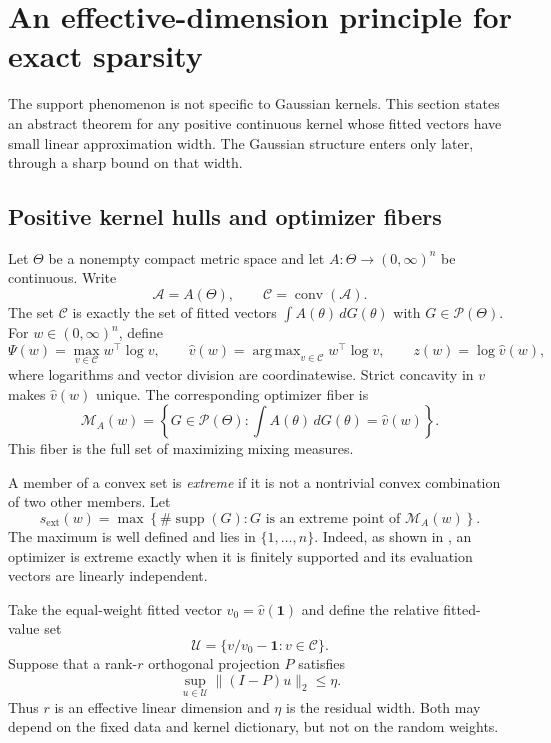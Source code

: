 \documentclass[11pt]{article}
\theoremstyle{definition}
\theoremstyle{remark}
\DeclareMathOperator*{\argmax}{arg\,max}
\DeclareMathOperator{\conv}{conv}
\DeclareMathOperator{\supp}{supp}
\newcommand{\Pcal}{\mathcal P}
\newcommand{\Mcal}{\mathcal M}
\newcommand{\Ccal}{\mathcal C}
\newcommand{\Acal}{\mathcal A}
\newcommand{\Ucal}{\mathcal U}
\newcommand{\one}{\bm 1}
\newcommand{\norm}[1]{\lVert #1\rVert}
\newcommand{\vhat}{\widehat v}
\begin{document}
\section{An effective-dimension principle for exact sparsity}
\label{sec:effective}

The support phenomenon is not specific to Gaussian kernels.  This section
states an abstract theorem for any positive continuous kernel whose fitted
vectors have small linear approximation width.  The Gaussian structure enters
only later, through a sharp bound on that width.

\subsection{Positive kernel hulls and optimizer fibers}

Let $\Theta$ be a nonempty compact metric space and let
$A:\Theta\to(0,\infty)^n$ be continuous.  Write
\[
 \Acal=A(\Theta),\qquad \Ccal=\conv(\Acal).
\]
The set $\Ccal$ is exactly the set of fitted vectors
$\int A(\theta)\,dG(\theta)$ with $G\in\Pcal(\Theta)$.  For
$w\in(0,\infty)^n$, define
\begin{equation}\label{eq:value}
 \Psi(w)=\max_{v\in\Ccal}w^\top\log v,
 \qquad
 \vhat(w)=\argmax_{v\in\Ccal}w^\top\log v,
 \qquad z(w)=\log\vhat(w),
\end{equation}
where logarithms and vector division are coordinatewise.  Strict concavity in
$v$ makes $\vhat(w)$ unique.  The corresponding optimizer fiber is
\begin{equation}\label{eq:fiber}
 \Mcal_A(w)=\left\{G\in\Pcal(\Theta):
       \int A(\theta)\,dG(\theta)=\vhat(w)\right\}.
\end{equation}
This fiber is the full set of maximizing mixing measures.

A member of a convex set is \emph{extreme} if it is not a nontrivial convex
combination of two other members.  Let
\begin{equation}\label{eq:sext}
 s_{\mathrm{ext}}(w)=
 \max\left\{\#\supp(G):G\text{ is an extreme point of }\Mcal_A(w)\right\}.
\end{equation}
The maximum is well defined and lies in $\{1,\ldots,n\}$.  Indeed, as shown in
, an optimizer is extreme exactly when it is finitely
supported and its evaluation vectors are linearly independent.

Take the equal-weight fitted vector $v_0=\vhat(\one)$ and define the relative
fitted-value set
\begin{equation}\label{eq:relative-set}
 \Ucal=\{v/v_0-\one:v\in\Ccal\}.
\end{equation}
Suppose that a rank-$r$ orthogonal projection $P$ satisfies
\begin{equation}\label{eq:width}
 \sup_{u\in\Ucal}\norm{(I-P)u}_2\le\eta.
\end{equation}
Thus $r$ is an effective linear dimension and $\eta$ is the residual width.
Both may depend on the fixed data and kernel dictionary, but not on the random
weights.
\end{document}
